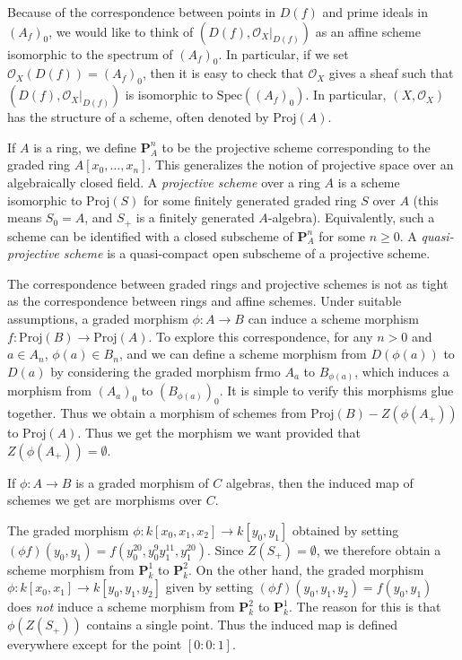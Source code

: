 Because of the correspondence between points in $D(f)$ and prime ideals in $(A_f)_0$, we would like to think of $(D(f),\mathcal{O}_X|_{D(f)})$ as an affine scheme isomorphic to the spectrum of $(A_f)_0$. In particular, if we set $\mathcal{O}_X(D(f)) = (A_f)_0$, then it is easy to check that $\mathcal{O}_X$ gives a sheaf such that $(D(f),\mathcal{O}_X|_{D(f)})$ is isomorphic to $\text{Spec}((A_f)_0)$. In particular, $(X,\mathcal{O}_X)$ has the structure of a scheme, often denoted by $\text{Proj}(A)$.

If $A$ is a ring, we define $\mathbf{P}^n_A$ to be the projective scheme corresponding to the graded ring $A[x_0,\dots,x_n]$. This generalizes the notion of projective space over an algebraically closed field. A \emph{projective scheme} over a ring $A$ is a scheme isomorphic to $\text{Proj}(S)$ for some finitely generated graded ring $S$ over $A$ (this means $S_0 = A$, and $S_+$ is a finitely generated $A$-algebra). Equivalently, such a scheme can be identified with a closed subscheme of $\mathbf{P}^n_A$ for some $n \geq 0$. A \emph{quasi-projective scheme} is a quasi-compact open subscheme of a projective scheme.

The correspondence between graded rings and projective schemes is not as tight as the correspondence between rings and affine schemes. Under suitable assumptions, a graded morphism $\phi: A \to B$ can induce a scheme morphism $f: \text{Proj}(B) \to \text{Proj}(A)$. To explore this correspondence, for any $n > 0$ and $a \in A_n$, $\phi(a) \in B_n$, and we can define a scheme morphism from $D(\phi(a))$ to $D(a)$ by considering the graded morphism frmo $A_a$ to $B_{\phi(a)}$, which induces a morphism from $(A_a)_0$ to $(B_{\phi(a)})_0$. It is simple to verify this morphisms glue together. Thus we obtain a morphism of schemes from $\text{Proj}(B) - Z(\phi(A_+))$ to $\text{Proj}(A)$. Thus we get the morphism we want provided that $Z(\phi(A_+)) = \emptyset$.

\begin{remark}
    If $\phi:A \to B$ is a graded morphism of $C$ algebras, then the induced map of schemes we get are morphisms over $C$.
\end{remark}

\begin{example}
    The graded morphism $\phi: k[x_0,x_1,x_2] \to k[y_0,y_1]$ obtained by setting $(\phi f)(y_0,y_1) = f(y_0^{20}, y_0^9 y_1^{11}, y_1^{20})$. Since $Z(S_+) = \emptyset$, we therefore obtain a scheme morphism from $\mathbf{P}^1_k$ to $\mathbf{P}^2_k$. On the other hand, the graded morphism $\phi: k[x_0,x_1] \to k[y_0,y_1,y_2]$ given by setting $(\phi f)(y_0,y_1,y_2) = f(y_0,y_1)$ does \emph{not} induce a scheme morphism from $\mathbf{P}^2_k$ to $\mathbf{P}^1_k$. The reason for this is that $\phi(Z(S_+))$ contains a single point. Thus the induced map is defined everywhere except for the point $[0:0:1]$.
\end{example}




